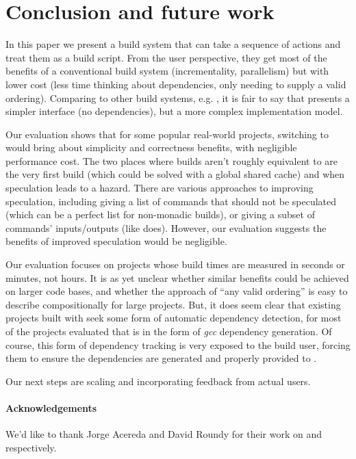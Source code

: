 \section{Conclusion and future work}
\label{sec:conclusion}

In this paper we present a build system that can take a sequence of actions and treat them as a build script. From the user perspective, they get most of the benefits of a conventional build system (incrementality, parallelism) but with lower cost (less time thinking about dependencies, only needing to supply a valid ordering). Comparing \Rattle to other build systems, e.g. \Make, it is fair to say that \Rattle presents a simpler interface (no dependencies), but a more complex implementation model.

Our evaluation shows that for some popular real-world projects, switching to \Rattle would bring about simplicity and correctness benefits, with negligible performance cost. The two places where builds aren't roughly equivalent to \Make are the very first build (which could be solved with a global shared cache) and when speculation leads to a hazard. There are various approaches to improving speculation, including giving \Rattle a list of commands that should not be speculated (which can be a perfect list for non-monadic builds), or giving \Rattle a subset of commands' inputs/outputs (like \Fac does). However, our evaluation suggests the benefits of improved speculation would be negligible.

Our evaluation focuses on projects whose build times are measured in seconds or minutes, not hours. It is as yet unclear whether similar benefits could be achieved on larger code bases, and whether the \Rattle approach of ``any valid ordering'' is easy to describe compositionally for large projects.  But, it does seem clear that existing projects built with \Make seek some form of automatic dependency detection, for most of the projects evaluated that is in the form of \emph{gcc} dependency generation.  Of course, this form of dependency tracking is very exposed to the build user, forcing them to ensure the dependencies are generated and properly provided to \Make. 


Our next steps are scaling \Rattle and incorporating feedback from actual users.

\paragraph{Acknowledgements} We'd like to thank Jorge Acereda and David Roundy for their work on \Fsatrace and \Bigbro respectively.

